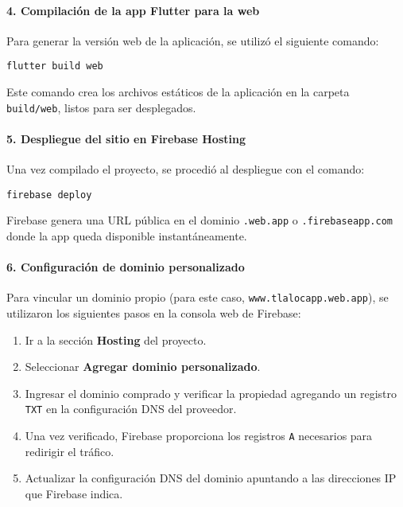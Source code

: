 \paragraph{4. Compilación de la app Flutter para la web}

Para generar la versión web de la aplicación, se utilizó el siguiente comando:

\begin{verbatim}
flutter build web
\end{verbatim}

Este comando crea los archivos estáticos de la aplicación en la carpeta \texttt{build/web}, listos para ser desplegados.

\paragraph{5. Despliegue del sitio en Firebase Hosting}

Una vez compilado el proyecto, se procedió al despliegue con el comando:

\begin{verbatim}
firebase deploy
\end{verbatim}

Firebase genera una URL pública en el dominio \texttt{.web.app} o \texttt{.firebaseapp.com} donde la app queda disponible instantáneamente.

\paragraph{6. Configuración de dominio personalizado}

Para vincular un dominio propio (para este caso, \texttt{www.tlalocapp.web.app}), se utilizaron los siguientes pasos en la consola web de Firebase:

\begin{enumerate}
    \item Ir a la sección \textbf{Hosting} del proyecto.
    \item Seleccionar \textbf{Agregar dominio personalizado}.
    \item Ingresar el dominio comprado y verificar la propiedad agregando un registro \texttt{TXT} en la configuración DNS del proveedor.
    \item Una vez verificado, Firebase proporciona los registros \texttt{A} necesarios para redirigir el tráfico.
    \item Actualizar la configuración DNS del dominio apuntando a las direcciones IP que Firebase indica.
\end{enumerate}

